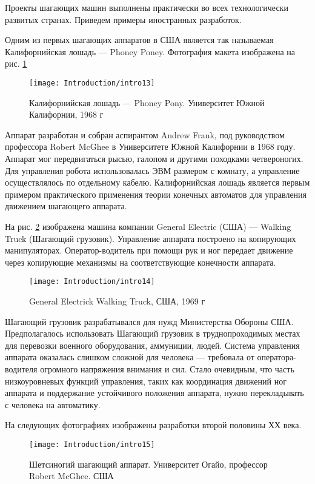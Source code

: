 Проекты шагающих машин выполнены практически во всех технологически развитых странах. Приведем примеры иностранных разработок.

Одним из первых шагающих аппаратов в США является так называемая Калифорнийская лошадь --- Phoney Poney. Фотография макета изображена на рис. \ref{img:phoney_poney}

\begin{figure}[ht]
	\centering
	\texttt{[image: Introduction/intro13]}
	\caption{Калифорнийская лошадь --- Phoney Pony. Университет Южной Калифорнии, 1968 г }
	\label{img:phoney_poney}
\end{figure}

Аппарат разработан и собран аспирантом Andrew Frank, под руководством профессора Robert McGhee в Университете Южной Калифорнии в 1968 году. Аппарат мог передвигаться рысью, галопом и другими походками четвероногих. Для управления робота использовалась ЭВМ размером с комнату, а управление осуществлялось по отдельному кабелю. Калифорнийская лошадь является первым примером практического применения теории конечных автоматов для управления движением шагающего аппарата.

На рис. \ref{img:walking_truck} изображена машина компании General Electric (США) ---  Walking Truck (Шагающий грузовик). Управление аппарата построено на копирующих манипуляторах. Оператор-водитель при помощи рук и ног передает движение через копирующие механизмы на соответствующие конечности аппарата.

\begin{figure}[ht]
	\centering
	\texttt{[image: Introduction/intro14]}
	\caption{General Electrick Walking Truck, США, 1969 г}
	\label{img:walking_truck}
\end{figure}

Шагающий грузовик разрабатывался для нужд Министерства Обороны США. Предполагалось использовать Шагающий грузовик в труднопроходимых местах для перевозки военного оборудования, аммуниции, людей. Система управления аппарата оказалась слишком сложной для человека --- требовала от оператора-водителя огромного напряжения внимания и сил. Стало очевидным, что часть низкоуровневых функций управления, таких как координация движений ног аппарата и поддержание устойчивого положения аппарата, нужно перекладывать с человека на автоматику.

На следующих фотографиях изображены разработки второй половины ХХ века.

\begin{figure}[ht]
	\centering
	\texttt{[image: Introduction/intro15]}
	\caption{Шетсиногий шагающий аппарат. Университет Огайо, профессор Robert McGhee. США}
	\label{img:intro15}
\end{figure}


